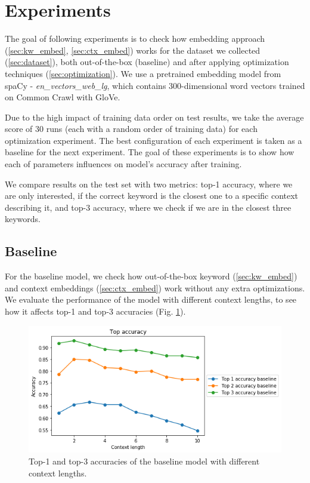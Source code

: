 \documentclass{llncs}
\begin{document}
\section{Experiments}
The goal of following experiments is to check how embedding approach (\ref{sec:kw_embed}, \ref{sec:ctx_embed}) works for the dataset we collected (\ref{sec:dataset}), both out-of-the-box (baseline) and after applying optimization techniques (\ref{sec:optimization}).
We use a pretrained embedding model from spaCy - \textit{en\_vectors\_web\_lg}, which contains 300-dimensional word vectors trained on Common Crawl with GloVe\cite{spacymodel}.

Due to the high impact of training data order on test results, we take the average score of 30 runs (each with a random order of training data) for each optimization experiment.
The best configuration of each experiment is taken as a baseline for the next experiment.
The goal of these experiments is to show how each of parameters influences on model's accuracy after training.

We compare results on the test set with two metrics: top-1 accuracy, where we are only interested, if the correct keyword is the closest one to a specific context describing it, and top-3 accuracy, where we check if we are in the closest three keywords.

\subsection{Baseline}
\label{sec:baseline}
For the baseline model, we check how out-of-the-box keyword (\ref{sec:kw_embed}) and context embeddings (\ref{sec:ctx_embed}) work without any extra optimizations.
We evaluate the performance of the model with different context lengths, to see how it affects top-1 and top-3 accuracies (Fig. \ref{fig:baseline}).

\begin{figure}
    \centering
    \caption{Top-1 and top-3 accuracies of the baseline model with different context lengths.}
    \label{fig:baseline}
    \includegraphics[scale=0.7]{res/baseline_context_top_acc.png}
\end{figure}
\end{document}
